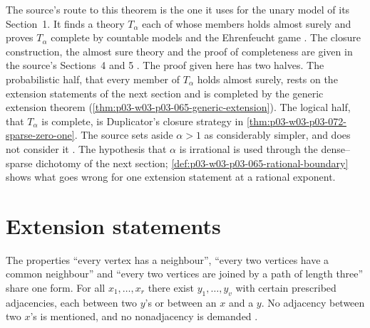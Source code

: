 The source's route to this theorem is the one it uses for the unary model of
its Section~1.  It finds a theory \(T_\alpha\) each of whose members holds
almost surely and proves \(T_\alpha\) complete by countable models and the
Ehrenfeucht game \cite[pp.~3 and 6]{Spencer2007LogicRandomStructuresAuthor}.
The closure construction, the almost sure theory and the proof of
completeness are given in the source's Sections~4 and 5
\cite[pp.~8--12]{Spencer2007LogicRandomStructuresAuthor}.  The proof given
here has two halves.  The probabilistic half, that every member of
\(T_\alpha\) holds almost surely, rests on the extension statements of the
next section and is completed by the generic extension theorem
(\cref{thm:p03-w03-p03-065-generic-extension}).  The logical half, that
\(T_\alpha\) is complete, is Duplicator's closure strategy in
\cref{thm:p03-w03-p03-072-sparse-zero-one}.  The source sets aside
\(\alpha>1\) as considerably simpler, and does not consider it
\cite[p.~6]{Spencer2007LogicRandomStructuresAuthor}.  The hypothesis that
\(\alpha\) is irrational is used through the dense--sparse dichotomy of the
next section; \cref{def:p03-w03-p03-065-rational-boundary} shows what goes
wrong for one extension statement at a rational exponent.

\section{Extension statements}
\label{sec:p03-w03-p03-065-extension-statements}

The properties ``every vertex has a neighbour'', ``every two vertices have a
common neighbour'' and ``every two vertices are joined by a path of length
three'' share one form.  For all \(x_1,\ldots,x_r\) there exist
\(y_1,\ldots,y_v\) with certain prescribed adjacencies, each between two
\(y\)'s or between an \(x\) and a \(y\).  No adjacency between two \(x\)'s
is mentioned, and no nonadjacency is demanded
\cite[p.~6]{Spencer2007LogicRandomStructuresAuthor}.

